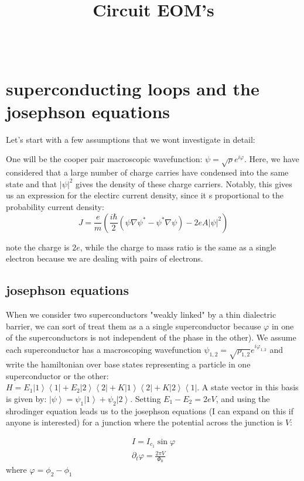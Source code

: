 \documentclass[paper=a4, twocolumn, fontsize=10pt]{article} %
\title{	
\normalfont \normalsize 
\horrule{.5pt}\\ %
\Large Circuit EOM's \\ 
\horrule{1pt}\\ %
}
\author{}
\date{\normalsize}%
\numberwithin{equation}{section} %
\numberwithin{figure}{section} %
\numberwithin{table}{section} %
\def\ket#1{\left\vert #1 \right\rangle}
\def\bra#1{\left\langle #1 \right\vert}
\begin{document}
 

\maketitle %

\section{superconducting loops and the josephson equations}

Let's start with a few assumptions that we wont investigate in detail:

One will be the cooper pair macroscopic wavefunction:
$\psi = \sqrt{\rho} e^{i\varphi}$. Here, we have considered that a large number of charge carries have condensed into the same state and that $|\psi|^2$ gives the density of these charge carriers. Notably, this gives us an expression for the electirc current density, since it s proportional to the probability current density:
 \[ J = \frac{e}{m} \left( \frac{i\hbar}{2} \left(\psi\nabla\psi^* - \psi^*\nabla\psi\right) - 2e A |\psi|^2\right) \]


 note the charge is $2e$, while the charge to mass ratio is the same as a single electron because we are dealing with pairs of electrons.
\\
\subsection{josephson equations}
When we consider two superconductors "weakly linked" by a thin dialectric barrier, we can sort of treat them as a a single superconductor because $\varphi$ in one of the superconductors is not independent of the phase in the other). We assume each superconductor has a macroscoping wavefunction $\psi_{1,2} = \sqrt{\rho_{1,2}} e^{i\varphi_{1,2}}$ and write the hamiltonian over base states representing a particle in one superconductor or the other: $H =E_1 \ket{1}\bra{1} + E_2 \ket{2}\bra{2} + K \ket{1}\bra{2} + K \ket{2}\bra{1}$. A state vector in this basis is given by: $\ket{\psi} = \psi_1 \ket{1} + \psi_2\ket{2}$.  Setting $E_1 - E_2 = 2eV$, and using the shrodinger equation leads us to the josephson equations (I can expand on this if anyone is interested) for a junction where the potential across the junction is $V$:

\begin{align}
    I = I_{c_1} \sin \varphi
    \\
    \partial_t \varphi = \frac{2\pi V}{\Phi_0}
\end{align}
where $\varphi = \phi_2 - \phi_1$
\end{document}

